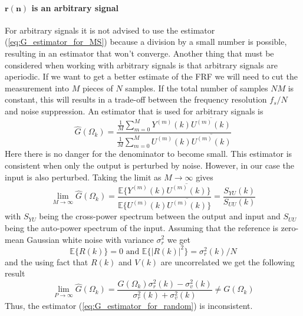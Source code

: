 \paragraph{$\boldsymbol{r(n)}$ is an arbitrary signal}
For arbitrary signals it is not advised to use the estimator (\ref{eq:G_estimator_for_MS}) because a division by a small number is possible, resulting in an estimator that won't converge. Another thing that must be considered when working with arbitrary signals is that arbitrary signals are aperiodic. If we want to get a better estimate of the FRF we will need to cut the measurement into $M$ pieces of $N$ samples. If the total number of samples $N\!M$ is constant, this will results in a trade-off between the frequency resolution $f_s/N$ and noise suppression. An estimator that is used for arbitrary signals is
\begin{equation}
    \hat G(\Omega_k) = \frac{ \frac{1}{M}\sum_{m=0}^M Y^{(m)}(k) \overline{U^{(m)}(k)} } { \frac{1}{M}\sum_{m=0}^M U^{(m)}(k) \overline{U^{(m)}(k)} }
    \label{eq:G_estimator_for_random}
\end{equation}
Here there is no danger for the denominator to become small. This estimator is consistent when only the output is perturbed by noise. However, in our case the input is also perturbed. Taking the limit as $M \rightarrow \infty$ gives
\begin{equation*}
    \lim_{M\rightarrow\infty} \hat G(\Omega_k) = \frac{ \mathbb{E}\{ Y^{(m)}(k) \overline{U^{(m)}(k)}\}} { \mathbb{E}\{ U^{(m)}(k) \overline{U^{(m)}(k)} \}} = \frac{ S_{YU}(k)} { S_{UU}(k)}
\end{equation*}
with $S_{YU}$ being the cross-power spectrum between the output and input and $S_{UU}$ being the auto-power spectrum of the input. Assuming that the reference is zero-mean Gaussian white noise with variance $\sigma_r^2$ we get
\begin{equation*}
    \mathbb{E}\{R(k)\} = 0 \text{ and } \mathbb{E}\{|R(k)|^2\} = \sigma_r^2(k)/N
\end{equation*}
and the using fact that $R(k)$ and $V(k)$ are uncorrelated we get the following result
\begin{equation*}
    \lim_{P\rightarrow\infty} \hat G(\Omega_k) = \frac{G(\Omega_k) \sigma_r^2(k) - \sigma_v^2(k)}{\sigma_r^2(k) + \sigma_v^2(k)} \neq G(\Omega_k)
\end{equation*}
Thus, the estimator (\ref{eq:G_estimator_for_random}) is inconsistent.

